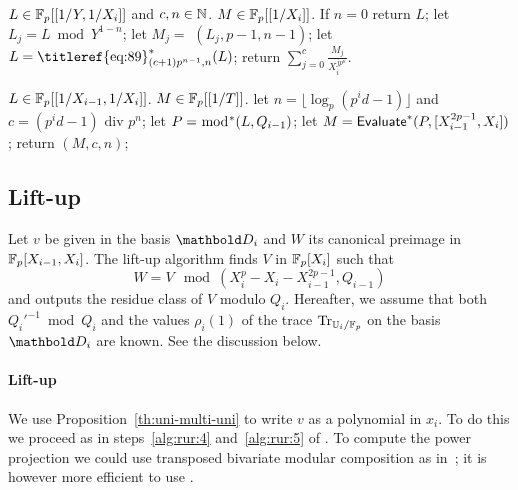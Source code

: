 \begin{algorithm}
  \caption{$\dual{}$}
  \label{alg:push-down-rec-star}
  \begin{algorithmic}[1]
    \REQUIRE $L\in\mathbb{F}_p[[1/Y,1/X_i]]$ and $c,n\in\mathbb{N}$.
    \ENSURE $M\in \mathbb{F}_p[[1/X_i]]$.
    \STATE If $n=0$ return $L$;
    \STATE let $L_j = L \bmod Y^{1-n}$;
    \STATE let $M_j=$ $(L_j,p-1,n-1)$;
    \STATE let $L = \dual{\text{\titleref{eq:89}}_{(c+1)p^{n-1},n}}(L)$;
    \ENDFOR
    \STATE return $\sum_{j=0}^{c} \frac{M_j}{X_i^{jp^n}}$.
  \end{algorithmic}
\end{algorithm}

\begin{algorithm}
  \caption{$\dual{}$}
  \label{alg:push-down-star}
  \begin{algorithmic}[1]
    \REQUIRE $L\in \mathbb{F}_p[[1/X_{i-1},1/X_i]]$.
    \ENSURE $M \in \mathbb{F}_p[[1/T]]$.
    \STATE let $n=\lfloor \log_p(p^id-1) \rfloor$ and $c=(p^id-1) \text{ div } p^n$;
    \STATE let $P=\bmod^\ast(L,Q_{i-1})$;
    \STATE let $M = \text{\textup{\textsf{Evaluate}}}^\ast(P,[X_{i-1}^{2p-1},X_i])$;
    \STATE return $(M,c,n)$;
  \end{algorithmic}
\end{algorithm}



\subsection{Lift-up}
\label{sec:level-embedding:lift-up}

Let $v$ be given in the basis $\basis{D}_i$ and $W$ its canonical
preimage in $\mathbb{F}_p[X_{i-1},X_i]$.  The lift-up algorithm finds $V$ in
$\mathbb{F}_p[X_i]$ such that
\begin{equation}
  \label{eq:93}
  W=V \mod
  (X_i^p-X_i-X_{i-1}^{2p-1},Q_{i-1})
\end{equation}
and outputs the residue class of $V$ modulo $Q_i$. Hereafter, we
assume that both $Q_i'^{-1} \bmod Q_i$ and the values $\rho_i(1)$ of
the trace $\operatorname{Tr}_{\mathbb{U}_i/\mathbb{F}_p}$ on the basis $\basis{D}_i$ are known.  See
the discussion below.

\paragraph{Lift-up}
We use Proposition~\ref{th:uni-multi-uni} to write $v$ as a
polynomial in $x_i$. To do this we proceed as in steps~\ref{alg:rur:4}
and~\ref{alg:rur:5} of .  To compute the power projection we
could use transposed bivariate modular composition as
in~\cite{shoup99}; it is however more efficient to use
.

